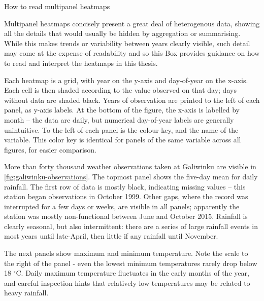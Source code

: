 \checkoddpage\ifoddpage\ObservationMultipanels\fi

\begin{framedbox}
\caption[How to read multipanel heatmaps]{How to read multipanel heatmaps}
\label{fig:how-read-multipanel}
    \setlength{\parskip}{4pt}
    \setlength{\parindent}{18pt}

    Multipanel heatmaps concisely present a great deal of heterogenous data,
    showing all the details that would usually be hidden by aggregation or
    summarising.  While this makes trends or variability between years clearly
    visible, such detail may come at the expense of readability and so this
    Box provides guidance on how to read and interpret the heatmaps in this thesis.

    Each heatmap is a grid, with year on the y-axis and day-of-year on the
    x-axis.  Each cell is then shaded according
    to the value observed on that day; days  without data are shaded black.
    Years of observation are printed to the left of each panel, as y-axis labels.
    At the bottom of the figure, the x-axis is labelled by month -- the data
    are daily, but numerical day-of-year labels are generally unintuitive.
    To the left of each panel is the colour key, and the name of the variable.
    This color key is identical for panels of the same variable across all
    figures, for easier comparison.

    More than forty thousand  weather observations taken at Galiwinku are
    visible in \cref{fig:galiwinku-observations}.
    The topmost panel shows the five-day mean for daily rainfall.
    The first row of data is mostly black, indicating missing
    values -- this station began observations in October 1999.  Other gaps,
    where the record was interrupted for a few days or weeks, are visible in
    all panels; apparently the station was mostly non-functional between June
    and October 2015.
    Rainfall is clearly seasonal, but also intermittent:  there are a series
    of large rainfall events in most years until late-April, then little if any
    rainfall until November.

    The next panels show maximum and minimum temperature.  Note the scale to
    the right of the panel - even the lowest minimum temperatures rarely drop
    below 18 $^\circ$C.  Daily maximum temperature fluctuates in the
    early months of the year, and careful inspection hints that relatively
    low temperatures may be related to heavy rainfall.


\end{framedbox}
